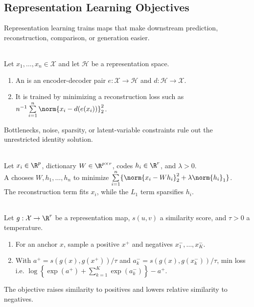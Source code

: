 \subsection{Representation Learning Objectives}

Representation learning trains maps that make downstream prediction, reconstruction, comparison, or generation easier.

\begin{definition} \label{def:sl-autoencoder} \\
Let $x_1,\ldots,x_n\in\mathcal{X}$ and let $\mathcal{H}$ be a representation space.
\begin{enumerate}[label=(\roman*)]
\setlength{\itemsep}{0pt}
\item An  is an encoder-decoder pair $e:\mathcal{X}\to\mathcal{H}$ and $d:\mathcal{H}\to\mathcal{X}$.
\item It is trained by minimizing a reconstruction loss such as $n^{-1}\sum\limits_{i=1}^n\norm{x_i-d(e(x_i))}_2^2$.
\end{enumerate}
Bottlenecks, noise, sparsity, or latent-variable constraints rule out the unrestricted identity solution.
\end{definition}

\begin{definition} \label{def:sl-sparse-representation-objective} \\
Let $x_i\in\R^p$, dictionary $W\in\R^{p\times r}$, codes $h_i\in\R^r$, and $\lambda>0$.\\
A  chooses $W,h_1,\ldots,h_n$ to minimize $\sum\limits_{i=1}^n\{\norm{x_i-Wh_i}_2^2+\lambda\norm{h_i}_1\}$.\\
The reconstruction term fits $x_i$, while the $L_1$ term sparsifies $h_i$.
\end{definition}

\begin{definition} \label{def:sl-contrastive-objective} \\
Let $g:\mathcal{X}\to\R^r$ be a representation map, $s(u,v)$ a similarity score, and $\tau>0$ a temperature.
\begin{enumerate}[label=(\roman*)]
\setlength{\itemsep}{0pt}
\item For an anchor $x$, sample a positive $x^+$ and negatives $x_1^-,\ldots,x_K^-$.
\item With $a^+=s(g(x),g(x^+))/\tau$ and $a_k^-=s(g(x),g(x_k^-))/\tau$, min loss i.e. $\log\left\{\exp(a^+)+\sum\limits_{k=1}^K\exp(a_k^-)\right\}-a^+$.
\end{enumerate}
The objective raises similarity to positives and lowers relative similarity to negatives.
\end{definition}
